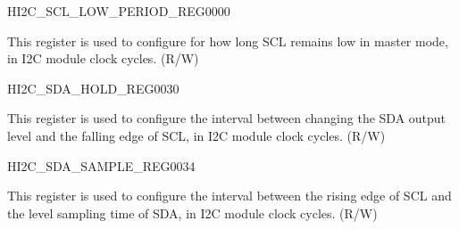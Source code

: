 \begin{register}{H}{I2C\_SCL\_LOW\_PERIOD\_REG}{\hexprefix{}0000}\label{regdesc:I2CSCLLOWPERIODREG}
%
%
\regnewline%
\begin{regdesc}\begin{reglist}
\label{fielddesc:I2CSCLLOWPERIOD}\item [I2C\_SCL\_LOW\_PERIOD] This register is used to configure for how long SCL remains low in master mode, in I2C module clock cycles. (R/W)
\end{reglist}\end{regdesc}
\end{register}


\begin{register}{H}{I2C\_SDA\_HOLD\_REG}{\hexprefix{}0030}\label{regdesc:I2CSDAHOLDREG}
%
%
\regnewline%
\begin{regdesc}\begin{reglist}
\label{fielddesc:I2CSDAHOLDTIME}\item [I2C\_SDA\_HOLD\_TIME] This register is used to configure the interval between changing the SDA output level and the falling edge of SCL, in I2C module clock cycles. (R/W)
\end{reglist}\end{regdesc}
\end{register}


\begin{register}{H}{I2C\_SDA\_SAMPLE\_REG}{\hexprefix{}0034}\label{regdesc:I2CSDASAMPLEREG}
%
%
\regnewline%
\begin{regdesc}\begin{reglist}
\label{fielddesc:I2CSDASAMPLETIME}\item [I2C\_SDA\_SAMPLE\_TIME] This register is used to configure the interval between the rising edge of SCL and the level sampling time of SDA, in I2C module clock cycles. (R/W)
\end{reglist}\end{regdesc}
\end{register}


